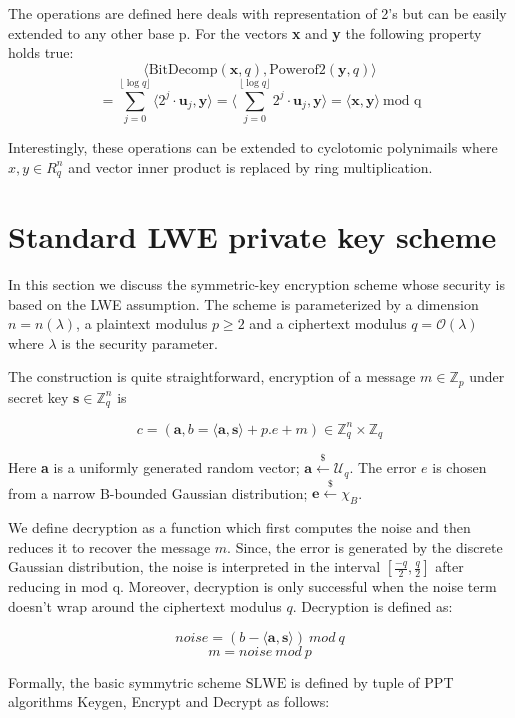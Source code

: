 \documentclass[10pt,journal,compsoc]{IEEEtran}
\theoremstyle{definition}
\begin{document}
The operations are defined here deals with representation of 2's but can be easily extended to any other base p. For the vectors \textbf{x} and \textbf{y} the following property holds true:
$$\langle \textrm{BitDecomp}\left( \textbf{x},q \right), \textrm{Powerof2}\left( \textbf{y},q \right) \rangle$$
$$= \sum_{j=0}^{\lfloor \log q \rfloor} \langle 2^j\cdot\textbf{u}_j,\textbf{y}\rangle = \langle \sum_{j=0}^{\lfloor \log q \rfloor} 2^j\cdot \textbf{u}_j,\textbf{y} \rangle = \langle \textbf{x},\textbf{y}\rangle \ \textrm{mod q}$$

Interestingly, these operations can be extended to cyclotomic polynimails where $x,y \in R_q^n$ and vector inner product is replaced by ring multiplication. 

\section{Standard LWE private key scheme}

In this section we discuss the symmetric-key encryption scheme whose security is based on the LWE assumption. The scheme is parameterized by a dimension $n = n(\lambda)$, a plaintext modulus $p \geq 2$ and a ciphertext modulus $q = \mathcal{O}\left(\lambda \right)$ where $\lambda$ is the security parameter.

The construction is quite straightforward, encryption of a message $m \in \mathbb{Z}_p$ under secret key $\textbf{s} \in \mathbb{Z}_q^n$ is

$$c = \left( \textbf{a},b = \langle \textbf{a},\textbf{s}\rangle + p.e + m\right) \in \mathbb{Z}_q^n \times \mathbb{Z}_q $$

Here \textbf{a} is a uniformly generated random vector; $\textbf{a} \xleftarrow{\$} \mathcal{U}_q$. The error $e$ is chosen from a narrow B-bounded Gaussian distribution; $\textbf{e} \xleftarrow{\$} \chi_B $.  

We define decryption as a function which first computes the noise and then reduces it to recover the message $m$. Since, the error is generated by the discrete Gaussian distribution, the noise is interpreted in the interval $\left[ \frac{-q}{2},\frac{q}{2}\right]$ after reducing in mod q. Moreover, decryption is only successful when the noise term doesn't wrap around the ciphertext modulus $q$. Decryption is defined as:

$$noise = \left( b - \langle \textbf{a},\textbf{s}\rangle \right) \ mod \ q $$
$$ m = noise \ mod \ p$$

 Formally, the basic symmytric scheme $\textrm{SLWE}$ is defined by tuple of PPT algorithms Keygen, Encrypt and Decrypt as follows:
 
\end{document}
